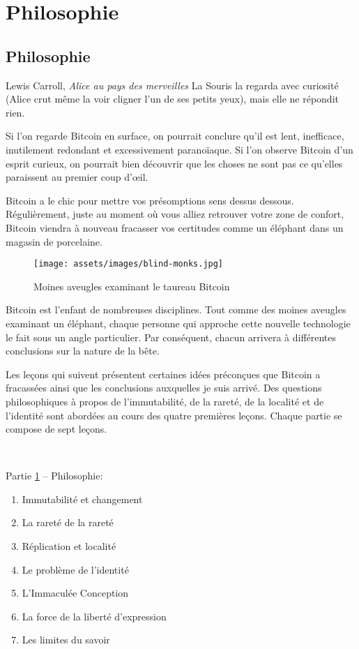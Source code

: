 \part{Philosophie}
\label{ch:philosophy}
\chapter*{Philosophie}

\begin{chapquote}{Lewis Carroll, \textit{Alice au pays des merveilles}}
  La Souris la regarda avec curiosité (Alice crut même la voir cligner l’un de
  ses petits yeux), mais elle ne répondit rien.
\end{chapquote}

Si l'on regarde Bitcoin en surface, on pourrait conclure qu'il est lent,
inefficace, inutilement redondant et excessivement paranoïaque. Si l'on observe
Bitcoin d'un esprit curieux, on pourrait bien découvrir que les choses ne sont
pas ce qu'elles paraissent au premier coup d'œil.

Bitcoin a le chic pour mettre vos présomptions sens dessus dessous.
Régulièrement, juste au moment où vous alliez retrouver votre zone de confort,
Bitcoin viendra à nouveau fracasser vos certitudes comme un éléphant dans un
magasin de porcelaine.

\begin{figure}
  \texttt{[image: assets/images/blind-monks.jpg]}
  \caption{Moines aveugles examinant le taureau Bitcoin}
  \label{fig:blind-monks}
\end{figure}

Bitcoin est l'enfant de nombreuses disciplines. Tout comme des moines aveugles
examinant un éléphant, chaque personne qui approche cette nouvelle technologie
le fait sous un angle particulier. Par conséquent, chacun arrivera à différentes
conclusions sur la nature de la bête.

Les leçons qui suivent présentent certaines idées préconçues que Bitcoin a
fracassées ainsi que les conclusions auxquelles je suis arrivé. Des questions
philosophiques à propos de l'immutabilité, de la rareté, de la localité et de
l'identité sont abordées au cours des quatre premières leçons. Chaque partie se
compose de sept leçons.

~

\begin{samepage}
Partie \hyperref[ch:philosophy]{1} -- Philosophie:

\begin{enumerate}
  \item Immutabilité et changement
  \item La rareté de la rareté
  \item Réplication et localité
  \item Le problème de l'identité
  \item L'Immaculée Conception
  \item La force de la liberté d'expression
  \item Les limites du savoir
\end{enumerate}
\end{samepage}


